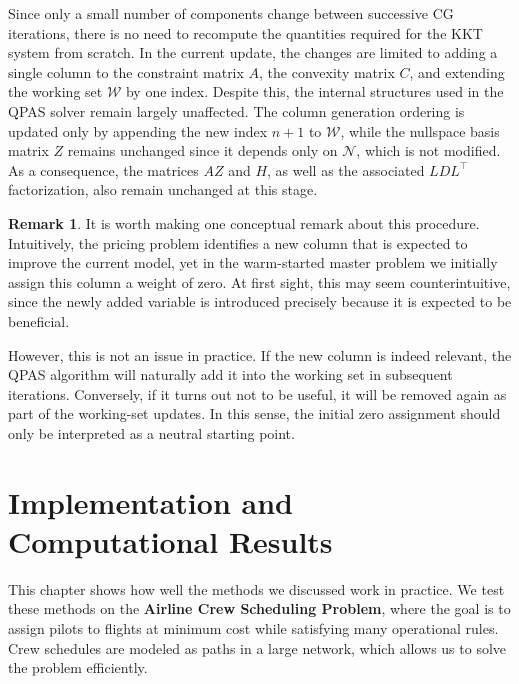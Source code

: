 \documentclass{book}
\theoremstyle{definition}
\newtheorem{remark}[theorem]{Remark}
\newcounter{algorithm_}
\numberwithin{algorithm_}{chapter}
\begin{document}
{Since only a small number of components change between successive CG iterations, there is no need to recompute the quantities required for the KKT system from scratch. In the current update, the changes are limited to adding a single column to the constraint matrix $A$, the convexity matrix $C$, and extending the working set $\mathcal{W}$ by one index.
Despite this, the internal structures used in the QPAS solver remain largely unaffected. The column generation ordering is updated only by appending the new index $n+1$ to $\mathcal{W}$, while the nullspace basis matrix $Z$ remains unchanged since it depends only on $\mathcal{N}$, which is not modified. As a consequence, the matrices $AZ$ and $H$, as well as the associated $LDL^\top$ factorization, also remain unchanged at this stage.

\bigskip

\begin{remark}

It is worth making one conceptual remark about this procedure. Intuitively, the pricing problem identifies a new column that is expected to improve the current model, yet in the warm-started master problem we initially assign this column a weight of zero. At first sight, this may seem counterintuitive, since the newly added variable is introduced precisely because it is expected to be beneficial.

\medskip

However, this is not an issue in practice. If the new column is indeed relevant, the QPAS algorithm will naturally add it into the working set in subsequent iterations. Conversely, if it turns out not to be useful, it will be removed again as part of the working-set updates. In this sense, the initial zero assignment should only be interpreted as a neutral starting point.

\end{remark}








\chapter{Implementation and Computational Results}
\label{chap:Implementation and Computational Results}



\vspace*{\fill}

This chapter shows how well the methods we discussed work in practice. We test these methods on the \textbf{Airline Crew Scheduling Problem}, where the goal is to assign pilots to flights at minimum cost while satisfying many operational rules. Crew schedules are modeled as paths in a large network, which allows us to solve the problem efficiently.

}
\end{document}
